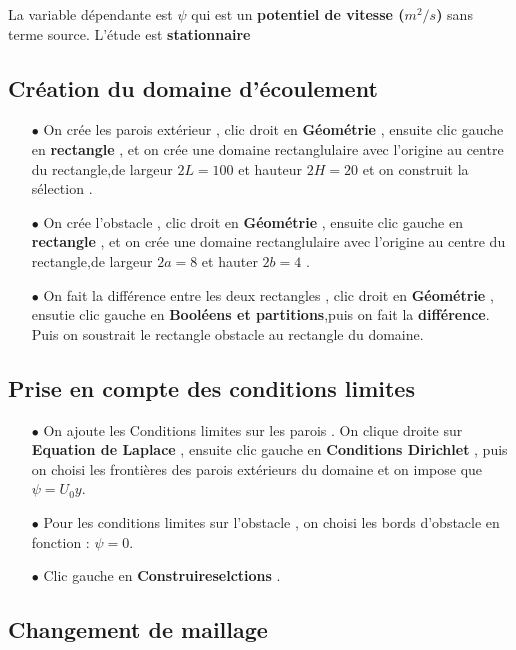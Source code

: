 \documentclass[a4paper,11pt]{report} %
\begin{document}
La variable dépendante est \textbf{$\psi$} qui est un \textbf{potentiel de vitesse ($m^2/s$)} sans terme source. L'étude est \textbf{stationnaire}

\subsection{Création du domaine d'écoulement}

\begin{itemize}
    \item[$\bullet$]On crée les parois extérieur , clic droit en \textbf{Géométrie} , ensuite clic gauche en \textbf{rectangle} , et on crée une domaine rectanglulaire avec l'origine au centre du rectangle,de largeur $2L=100$ et hauteur $2H=20$ et on construit la sélection .
    \item[$\bullet$]On crée l'obstacle , clic droit en \textbf{Géométrie} , ensuite clic gauche en \textbf{rectangle} , et on crée une domaine rectanglulaire avec l'origine au centre du rectangle,de largeur $2a=8$ et hauter $2b=4$ .
    \item[$\bullet$]On fait la différence entre les deux rectangles , clic droit en \textbf{Géométrie} , ensutie clic gauche en \textbf{Booléens et partitions},puis on fait la \textbf{différence}. Puis on soustrait le rectangle obstacle au rectangle du domaine.
\end{itemize}

\subsection{Prise en compte des conditions limites}

\begin{itemize}
    \item[$\bullet$] On ajoute les Conditions limites sur les parois . On clique  droite sur \textbf{Equation de Laplace} , ensuite clic gauche en \textbf{Conditions Dirichlet} , puis on choisi les frontières des parois extérieurs du domaine et on impose que $\psi=U_0y$.
    \item[$\bullet$] Pour les conditions limites sur l'obstacle , on choisi les bords d'obstacle en fonction : $\psi=0$.
    \item[$\bullet$]Clic gauche en \textbf{Construireselctions} .
\end{itemize}

\subsection{Changement de maillage}
\end{document}
